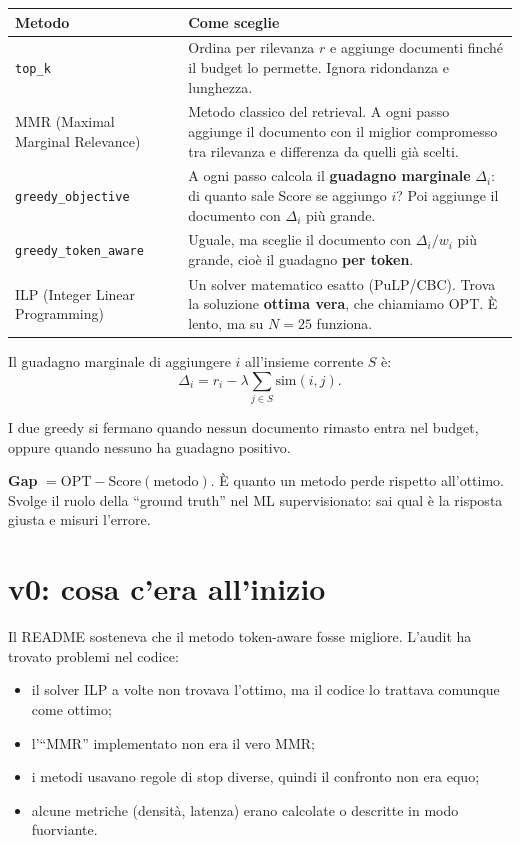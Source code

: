 \documentclass[11pt,a4paper]{article}
\newcommand{\code}[1]{\texttt{#1}}
\begin{document}
\begin{center}
\begin{tabularx}{\textwidth}{>{\raggedright\arraybackslash}p{3.6cm} X}
\toprule
\textbf{Metodo} & \textbf{Come sceglie} \\
\midrule
\code{top\_k} & Ordina per rilevanza $r$ e aggiunge documenti finché il budget lo permette. Ignora ridondanza e lunghezza. \\
MMR (Maximal Marginal Relevance) & Metodo classico del retrieval. A ogni passo aggiunge il documento con il miglior compromesso tra rilevanza e differenza da quelli già scelti. \\
\code{greedy\_objective} & A ogni passo calcola il \textbf{guadagno marginale} $\Delta_i$: di quanto sale Score se aggiungo $i$? Poi aggiunge il documento con $\Delta_i$ più grande. \\
\code{greedy\_token\_aware} & Uguale, ma sceglie il documento con $\Delta_i / w_i$ più grande, cioè il guadagno \textbf{per token}. \\
ILP (Integer Linear Programming) & Un solver matematico esatto (PuLP/CBC). Trova la soluzione \textbf{ottima vera}, che chiamiamo OPT. È lento, ma su $N=25$ funziona. \\
\bottomrule
\end{tabularx}
\end{center}

Il guadagno marginale di aggiungere $i$ all'insieme corrente $S$ è:
\[
\Delta_i = r_i - \lambda \sum_{j \in S} \mathrm{sim}(i,j).
\]

I due greedy si fermano quando nessun documento rimasto entra nel budget, oppure quando nessuno ha guadagno positivo.

\begin{nota}
\textbf{Gap} $= \mathrm{OPT} - \mathrm{Score}(\text{metodo})$. È quanto un metodo perde rispetto all'ottimo. Svolge il ruolo della ``ground truth'' nel ML supervisionato: sai qual è la risposta giusta e misuri l'errore.
\end{nota}

\section{v0: cosa c'era all'inizio}

Il README sosteneva che il metodo token-aware fosse migliore. L'audit ha trovato problemi nel codice:
\begin{itemize}
  \item il solver ILP a volte non trovava l'ottimo, ma il codice lo trattava comunque come ottimo;
  \item l'``MMR'' implementato non era il vero MMR;
  \item i metodi usavano regole di stop diverse, quindi il confronto non era equo;
  \item alcune metriche (densità, latenza) erano calcolate o descritte in modo fuorviante.
\end{itemize}
\end{document}
